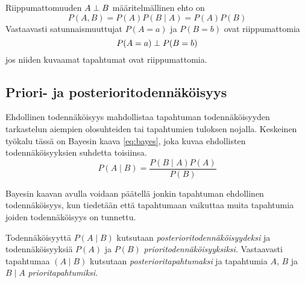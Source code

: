 Riippumattomuuden $A \perp B$ määritelmällinen ehto on
$$
    P(A,B) = P(A)P(B \mid A) = P(A)P(B) 
$$ 
Vastaavasti satunnaismuuttujat $P(A = a)$ ja $P(B = b)$ ovat riippumattomia 
$$
    P(A = a)  \perp P(B = b)
$$
jos niiden kuvaamat tapahtumat ovat riippumattomia. 


\subsection{Priori- ja posterioritodennäköisyys}
Ehdollinen todennäköisyys mahdollistaa  tapahtuman todennäköisyyden tarkastelun aiempien olosuhteiden tai tapahtumien tuloksen nojalla. Keskeinen työkalu tässä on Bayesin kaava \ref{eq:bayes}, joka kuvaa ehdollisten todennäköisyyksien suhdetta toisiinsa.
\begin{equation}\label{eq:bayes}
        P(A \mid B) = \frac{P(B \mid A)P(A)}{P(B)}
\end{equation}

Bayesin kaavan avulla voidaan päätellä jonkin tapahtuman ehdollinen todennäköisyys, kun tiedetään että tapahtumaan vaikuttaa muita tapahtumia joiden todennäköisyys on tunnettu.

Todennäköisyyttä $P(A \mid B)$ kutsutaan \emph{posterioritodennäköisyydeksi} ja todennäköisyyksiä $P(A)$ ja $P(B)$ \emph{prioritodennäköisyyksiksi}. Vastaavasti tapahtumaa $(A \mid B)$ kutsutaan \emph{posterioritapahtumaksi} ja tapahtumia $A$, $B$ ja $B \mid A$ \emph{prioritapahtumiksi}.
